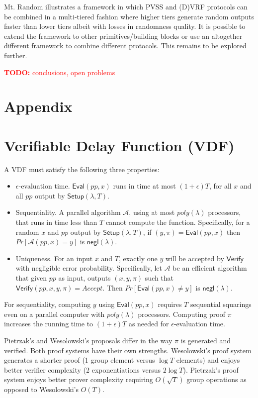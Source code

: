 \documentclass[letterpaper,twocolumn,10pt]{article}
\theoremstyle{definition}
\theoremstyle{remark}
\newcommand{\todo}[1]{\textcolor{red}{\textbf{TODO:} #1}}
\begin{document}
Mt. Random illustrates a framework in which PVSS and (D)VRF protocols can be combined in a multi-tiered fashion where higher tiers generate random outputs faster than lower tiers albeit with losses in randomness quality. It is possible to extend the framework to other primitives/building blocks or use an altogether different framework to combine different protocols. This remains to be explored further.

\todo{conclusions, open problems}

\printbibliography
\appendix
\section*{Appendix}
\renewcommand{\thesection}{\arabic{section}}
\section{Verifiable Delay Function (VDF)}
\label{appendix:vdf}

A VDF must satisfy the following three properties:
\begin{itemize}
\item $\epsilon$-evaluation time. $\mathsf{Eval}(pp, x)$ runs in time at most $(1 + \epsilon) T$, for all $x$ and all $pp$ output by $\mathsf{Setup}(\lambda, T)$.
\item Sequentiality. A parallel algorithm $\mathcal{A}$, using at most $poly(\lambda)$ processors, that runs in time less than $T$ cannot compute the function. Specifically, for a random $x$ and $pp$ output by $\mathsf{Setup}(\lambda, T)$, if $(y, \pi) = \mathsf{Eval}(pp, x)$ then $Pr[\mathcal{A}(pp, x) = y]$ is $\mathsf{negl(\lambda)}$.
\item Uniqueness. For an input $x$ and $T$, exactly one $y$ will be accepted by $\mathsf{Verify}$ with negligible error probability. Specifically, let $\mathcal{A}$ be an efficient algorithm that given $pp$ as input, outputs $(x, y, \pi)$ such that $\mathsf{Verify}(pp, x, y, \pi) = Accept$. Then $Pr[\mathsf{Eval}(pp, x) \neq y]$ is $\mathsf{negl(\lambda)}$.
\end{itemize}
For sequentiality, computing $y$ using $\mathsf{Eval}(pp,x)$ requires $T$ sequential squarings even on a parallel computer with $poly(\lambda)$ processors. Computing proof $\pi$ increases the running time to $(1+\epsilon)T$ as needed for $\epsilon$-evaluation time.

Pietrzak's \cite{pietrzak2018simple} and Wesolowski's \cite{wesolowski2019efficient} proposals differ in the way $\pi$ is generated and verified. Both proof systems have their own strengths. Wesolowski's proof system generates a shorter proof (1 group element versus $\log T$ elements) and enjoys better verifier complexity (2 exponentiations versus $2 \log T$). Pietrzak's proof system enjoys better prover complexity requiring $O(\sqrt{T})$ group operations as opposed to Wesolowski's $O(T)$.
\end{document}
